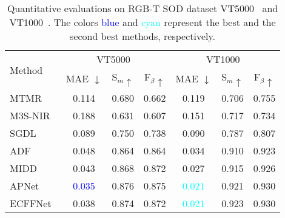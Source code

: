 \begin{table}[t]
\renewcommand\arraystretch{1.5}
\setlength\tabcolsep{5pt}
\centering
\caption{Quantitative evaluations on RGB-T SOD dataset VT5000~\cite{tu2022rgbtbench} and VT1000~\cite{tu2019rgb}.  The colors \textcolor{blue}{blue} and \textcolor{cyan}{cyan} represent the best and the second best methods, respectively.}
\label{tab:rgbt_sod}
\begin{tabular}{lcccccc} 
\toprule
\multirow{2}{*}{Method} & \multicolumn{3}{c}{VT5000~\cite{tu2022rgbtbench}}                           & \multicolumn{3}{c}{VT1000~\cite{tu2019rgb}}                            \\ 
\cmidrule[0.25pt](lr){2-4} \cmidrule[0.25pt](lr){5-7}
                        & MAE $\downarrow$ & S$_m\uparrow$ & F$_\beta\uparrow$ & MAE $\downarrow$ & S$_m\uparrow$ & F$_\beta\uparrow$  \\ 
\midrule
MTMR~\cite{wang2018rgb}                    & 0.114            & 0.680         & 0.662             & 0.119            & 0.706         & 0.755               \\ 

M3S-NIR~\cite{tu2019m3s}                 & 0.188            & 0.631         & 0.607             & 0.151            & 0.717         & 0.734               \\ 

SGDL~\cite{tu2019rgb}                    & 0.089            & 0.750         & 0.738             & 0.090            & 0.787         & 0.807               \\ 

ADF~\cite{tu2022rgbtbench}                     & 0.048            & 0.864         & 0.864             & 0.034            & 0.910         & 0.923               \\ 

MIDD~\cite{tu2021multi}                    & 0.043            & 0.868         & 0.872             & 0.027            & 0.915         & 0.926               \\ 

APNet~\cite{zhou2021apnet}                   & \textcolor{blue}{0.035}            & 0.876         & 0.875             & \textcolor{cyan}{0.021}            & 0.921         & 0.930               \\ 

ECFFNet~\cite{zhou2021ecffnet}                 & 0.038            & 0.874         & 0.872             & \textcolor{cyan}{0.021}            & 0.923         & 0.930               \\ 


\end{tabular}
\end{table}
